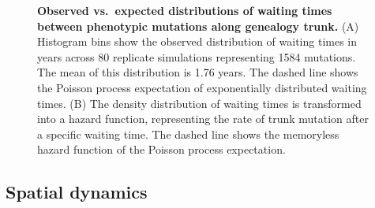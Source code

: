 \documentclass[11pt,oneside,letterpaper]{article}
\begin{document}
\begin{figure}[tb]
	\centering		
	\caption{\textbf{Observed vs.\ expected distributions of waiting times between phenotypic mutations along genealogy trunk.} (A) Histogram bins show the observed distribution of waiting times in years across 80 replicate simulations representing 1584 mutations.  The mean of this distribution is 1.76 years.  The dashed line shows the Poisson process expectation of exponentially distributed waiting times.  (B) The density distribution of waiting times is transformed into a hazard function, representing the rate of trunk mutation after a specific waiting time.  The dashed line shows the memoryless hazard function of the Poisson process expectation.}
	\label{waittimes}
\end{figure}

\subsection*{Spatial dynamics}
\end{document}
